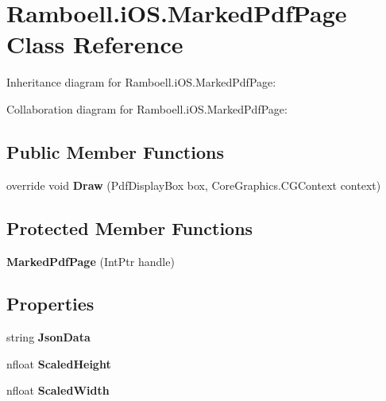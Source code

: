 \hypertarget{class_ramboell_1_1i_o_s_1_1_marked_pdf_page}{}\section{Ramboell.\+i\+O\+S.\+Marked\+Pdf\+Page Class Reference}
\label{class_ramboell_1_1i_o_s_1_1_marked_pdf_page}


Inheritance diagram for Ramboell.\+i\+O\+S.\+Marked\+Pdf\+Page\+:


Collaboration diagram for Ramboell.\+i\+O\+S.\+Marked\+Pdf\+Page\+:
\subsection*{Public Member Functions}
\begin{DoxyCompactItemize}
\item 
\mbox{\label{class_ramboell_1_1i_o_s_1_1_marked_pdf_page_a65755814023826ac65bbeb51de0a57df}} 
override void {\bfseries Draw} (Pdf\+Display\+Box box, Core\+Graphics.\+C\+G\+Context context)
\end{DoxyCompactItemize}
\subsection*{Protected Member Functions}
\begin{DoxyCompactItemize}
\item 
\mbox{\label{class_ramboell_1_1i_o_s_1_1_marked_pdf_page_a78ef07fec21885b0efeac660cd9d9009}} 
{\bfseries Marked\+Pdf\+Page} (Int\+Ptr handle)
\end{DoxyCompactItemize}
\subsection*{Properties}
\begin{DoxyCompactItemize}
\item 
\mbox{\label{class_ramboell_1_1i_o_s_1_1_marked_pdf_page_a3af85265b74d683b572e30af610b7501}} 
string {\bfseries Json\+Data}
\item 
\mbox{\label{class_ramboell_1_1i_o_s_1_1_marked_pdf_page_a67d8c4b594f553ef60a95485825470da}} 
nfloat {\bfseries Scaled\+Height}
\item 
\mbox{\label{class_ramboell_1_1i_o_s_1_1_marked_pdf_page_a52884963a5725af7aae3a37b7cd44d0a}} 
nfloat {\bfseries Scaled\+Width}
\end{DoxyCompactItemize}
